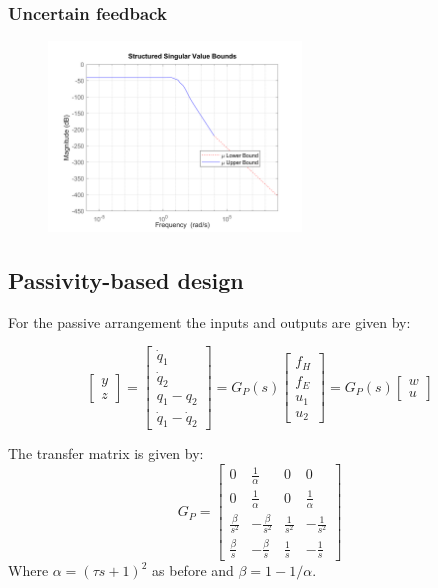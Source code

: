 \documentclass{article}
\begin{document}
\subsubsection{Uncertain feedback}

\begin{figure}[H]
    \centering
    \includegraphics[width=0.6\textwidth]{figures/structured_singular_values.png}
    \caption{}
\end{figure}

\subsection{Passivity-based design}

For the passive arrangement the inputs and outputs are given by:

\begin{equation}
    \begin{bmatrix}
        y \\
        z
    \end{bmatrix} = \begin{bmatrix}
        \dot{q}_1 \\
        \dot{q}_2 \\
        q_1 - q_2 \\
        \dot{q}_1 - \dot{q}_2
    \end{bmatrix} = G_P(s) \begin{bmatrix}
        f_H \\
        f_E \\
        u_1 \\
        u_2
    \end{bmatrix} = G_P(s) \begin{bmatrix}
        w \\
        u
    \end{bmatrix}
\end{equation}

The transfer matrix is given by:
\begin{equation}
    G_P = 
    \begin{bmatrix}
        0 & \frac{1}{\alpha} & 0 & 0 \\[6pt]
        0 & \frac{1}{\alpha} & 0 & \frac{1}{\alpha} \\[6pt]
        \frac{\beta}{s^2} & -\frac{\beta}{s^2} & \frac{1}{s^2} & -\frac{1}{s^2} \\[6pt]
        \frac{\beta}{s} & -\frac{\beta}{s} & \frac{1}{s} & -\frac{1}{s}
    \end{bmatrix}
\end{equation}
Where $\alpha = (\tau s + 1)^2$ as before and $\beta = 1 - 1/\alpha$.
\end{document}
